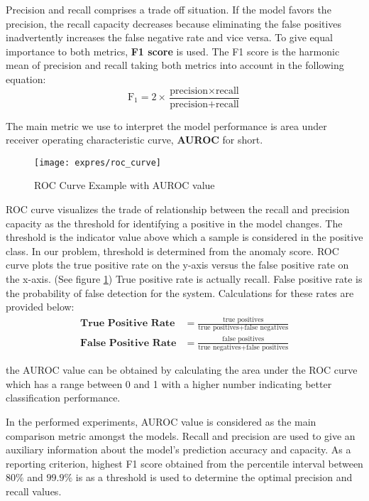 Precision and recall comprises a trade off situation. If the model favors the precision, the recall capacity
decreases because eliminating the false positives inadvertently increases the false negative rate and 
vice versa. To give equal importance to both metrics, \textbf{F1 score} is used. The F1 score is the 
harmonic mean of precision and recall taking both metrics into account in the following equation:
\begin{equation}
\text{F}_{1} = 2 \times \frac{\text{precision} \times \text{recall}}{\text{precision} + \text{recall}}
\end{equation}

The main metric we use to interpret the model performance is area under receiver operating characteristic 
curve, \textbf{AUROC} for short. 
\begin{figure}[h!]%
	\centering
	\texttt{[image: expres/roc\_curve]}
	\caption{ROC Curve Example with AUROC value}
	\label{fig:roc_curve}%
\end{figure}
ROC curve visualizes the trade of relationship between the recall and precision capacity as the threshold for 
identifying a positive in the model changes. The threshold is the indicator value above which a sample is considered in the 
positive class. In our problem, threshold is determined from the anomaly score. ROC curve plots the true positive rate 
on the y-axis versus the false positive rate on the x-axis. (See figure \ref{fig:roc_curve})
True positive rate is actually recall. False positive rate is the probability of false detection for the system. 
Calculations for these rates are provided below:
\begin{align}
\textbf{True Positive Rate} & = \frac{\text{true positives}}{\text{true positives} + \text{false negatives}} \\[5pt]
\textbf{False Positive Rate} & = \frac{\text{false positives}}{\text{true negatives} + \text{false positives}}
\end{align}

the AUROC value can be obtained by calculating the area under the ROC curve which has a range between 0 and 1 
with a higher number indicating better classification performance.

In the performed experiments, AUROC value is considered as the main comparison metric amongst the models. 
Recall and precision are used to give an auxiliary information about the model's prediction accuracy and capacity. 
As a reporting criterion, highest F1 score obtained from the percentile interval between $80\%$ and $99.9\%$ is 
as a threshold is used to determine the optimal precision and recall values. 

